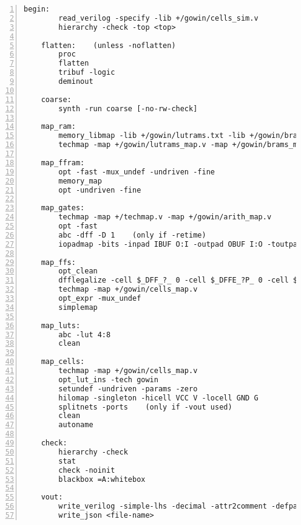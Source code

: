 \begin{lstlisting}[numbers=left,frame=single]
    begin:
        read_verilog -specify -lib +/gowin/cells_sim.v
        hierarchy -check -top <top>

    flatten:    (unless -noflatten)
        proc
        flatten
        tribuf -logic
        deminout

    coarse:
        synth -run coarse [-no-rw-check]

    map_ram:
        memory_libmap -lib +/gowin/lutrams.txt -lib +/gowin/brams.txt [-no-auto-block] [-no-auto-distributed]    (-no-auto-block if -nobram, -no-auto-distributed if -nolutram)
        techmap -map +/gowin/lutrams_map.v -map +/gowin/brams_map.v

    map_ffram:
        opt -fast -mux_undef -undriven -fine
        memory_map
        opt -undriven -fine

    map_gates:
        techmap -map +/techmap.v -map +/gowin/arith_map.v
        opt -fast
        abc -dff -D 1    (only if -retime)
        iopadmap -bits -inpad IBUF O:I -outpad OBUF I:O -toutpad TBUF ~OEN:I:O -tinoutpad IOBUF ~OEN:O:I:IO    (unless -noiopads)

    map_ffs:
        opt_clean
        dfflegalize -cell $_DFF_?_ 0 -cell $_DFFE_?P_ 0 -cell $_SDFF_?P?_ r -cell $_SDFFE_?P?P_ r -cell $_DFF_?P?_ r -cell $_DFFE_?P?P_ r
        techmap -map +/gowin/cells_map.v
        opt_expr -mux_undef
        simplemap

    map_luts:
        abc -lut 4:8
        clean

    map_cells:
        techmap -map +/gowin/cells_map.v
        opt_lut_ins -tech gowin
        setundef -undriven -params -zero
        hilomap -singleton -hicell VCC V -locell GND G
        splitnets -ports    (only if -vout used)
        clean
        autoname

    check:
        hierarchy -check
        stat
        check -noinit
        blackbox =A:whitebox

    vout:
        write_verilog -simple-lhs -decimal -attr2comment -defparam -renameprefix gen <file-name>
        write_json <file-name>
\end{lstlisting}

